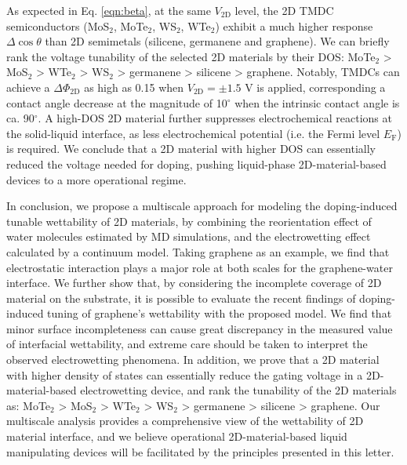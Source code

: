 \documentclass[journal=ancac3,manuscript=article,email=true]{achemso}
\begin{document}
As expected in Eq. \ref{eqn:beta}, at the same \(V_{\mathrm{2D}}\) level,
the 2D TMDC semiconductors (MoS\(_{\text{2}}\), MoTe\(_{\text{2}}\), WS\(_{\text{2}}\), WTe\(_{\text{2}}\)) exhibit a much
higher response \(\Delta \cos \theta\) than 2D semimetals (silicene,
germanene and graphene). We can briefly rank the voltage tunability of
the selected 2D materials by their DOS: MoTe\(_{\text{2}}\) > MoS\(_{\text{2}}\) > WTe\(_{\text{2}}\) > WS\(_{\text{2}}\)
> germanene > silicene > graphene. Notably, TMDCs can achieve a
\(\Delta \Phi_{\mathrm{2D}}\) as high as 0.15 when
\(V_{\mathrm{2D}}=\pm1.5\) V is applied, corresponding a contact angle
decrease at the magnitude of 10\(^{\circ}\) when the intrinsic contact
angle is ca. 90\(^{\circ}\).  A high-DOS 2D material further suppresses
electrochemical reactions at the solid-liquid interface, as less
electrochemical potential (i.e. the Fermi level \(E_{\mathrm{F}}\)) is
required. We conclude that a 2D material with higher DOS can
essentially reduced the voltage needed for doping, pushing
liquid-phase 2D-material-based devices to a more operational regime.


In conclusion, we propose a multiscale approach for modeling the
doping-induced tunable wettability of 2D materials, by combining the
reorientation effect of water molecules estimated by MD simulations,
and the electrowetting effect calculated by a continuum model. Taking
graphene as an example, we find that electrostatic interaction plays a
major role at both scales for the graphene-water interface. We further
show that, by considering the incomplete coverage of 2D material on
the substrate, it is possible to evaluate the recent findings of
doping-induced tuning of graphene's wettability with the proposed
model. We find that minor surface incompleteness can cause great
discrepancy in the measured value of interfacial wettability, and
extreme care should be taken to interpret the observed
electrowetting phenomena. In addition, we prove that a 2D material
with higher density of states can essentially reduce the gating
voltage in a 2D-material-based electrowetting device, and rank the
tunability of the 2D materials as: MoTe\(_{\text{2}}\) > MoS\(_{\text{2}}\) > WTe\(_{\text{2}}\) > WS\(_{\text{2}}\) >
germanene > silicene > graphene. Our multiscale analysis provides a
comprehensive view of the wettability of 2D material interface, and we
believe operational 2D-material-based liquid manipulating devices will
be facilitated by the principles presented in this letter.

\end{document}
